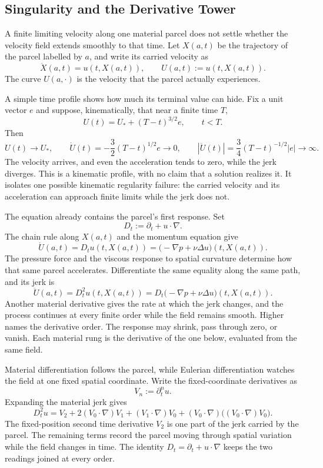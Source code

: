 \subsection{Singularity and the Derivative Tower}\label{sub:SingularityAndTheDerivativeTower}

A finite limiting velocity along one material parcel does not settle whether the velocity field extends smoothly to that time.
Let \(X(a,t)\) be the trajectory of the parcel labelled by \(a\), and write its carried velocity as
\[
  \dot X(a,t)=u(t,X(a,t)),
  \qquad
  U(a,t):=u(t,X(a,t)).
\]
The curve \(U(a,\cdot)\) is the velocity that the parcel actually experiences.

A simple time profile shows how much its terminal value can hide.
Fix a unit vector \(e\) and suppose, kinematically, that near a finite time \(T\),
\[
  U(t)=U_*+(T-t)^{3/2}e,
  \qquad t<T.
\]
Then
\[
  U(t)\longrightarrow U_*,
  \qquad
  \dot U(t)=-\frac32(T-t)^{1/2}e\longrightarrow0,
  \qquad
  |\ddot U(t)|=\frac34(T-t)^{-1/2}|e|\longrightarrow\infty.
\]
The velocity arrives, and even the acceleration tends to zero, while the jerk diverges.
This is a kinematic profile, with no claim that a \NavierStokes{} solution realizes it.
It isolates one possible kinematic regularity failure: the carried velocity and its acceleration can approach finite limits while the jerk does not.

The \NavierStokes{} equation already contains the parcel's first response.
Set
\[
  D_t:=\partial_t+u\cdot\nabla.
\]
The chain rule along \(X(a,t)\) and the momentum equation give
\[
  \dot U(a,t)
  =
  D_tu(t,X(a,t))
  =
  \bigl(-\nabla p+\nu\Delta u\bigr)(t,X(a,t)).
\]
The pressure force and the viscous response to spatial curvature determine how that same parcel accelerates.
Differentiate the same equality along the same path, and its jerk is
\[
  \ddot U(a,t)
  =
  D_t^2u(t,X(a,t))
  =
  D_t\bigl(-\nabla p+\nu\Delta u\bigr)(t,X(a,t)).
\]
Another material derivative gives the rate at which the jerk changes, and the process continues at every finite order while the field remains smooth.
Higher names the derivative order.
The response may shrink, pass through zero, or vanish.
Each material rung is the derivative of the one below, evaluated from the same \NavierStokes{} field.

Material differentiation follows the parcel, while Eulerian differentiation watches the field at one fixed spatial coordinate.
Write the fixed-coordinate derivatives as
\[
  V_n:=\partial_t^n u.
\]
Expanding the material jerk gives
\[
  D_t^2u
  =
  V_2
  +2(V_0\cdot\nabla)V_1
  +(V_1\cdot\nabla)V_0
  +(V_0\cdot\nabla)\bigl((V_0\cdot\nabla)V_0\bigr).
\]
The fixed-position second time derivative \(V_2\) is one part of the jerk carried by the parcel.
The remaining terms record the parcel moving through spatial variation while the field changes in time.
The identity \(D_t=\partial_t+u\cdot\nabla\) keeps the two readings joined at every order.

